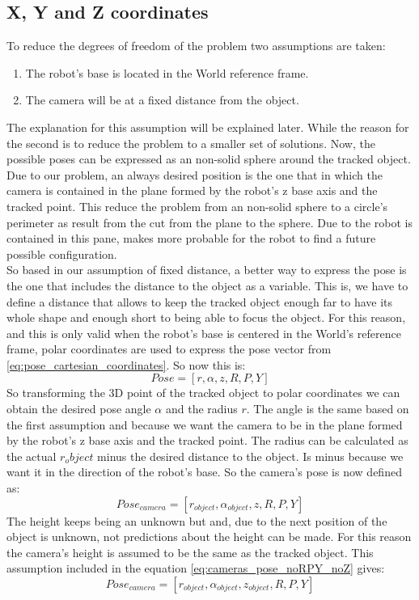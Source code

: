 \subsection{X, Y and Z coordinates} %
\label{sub:x_y_and_z_coordinates}
To reduce the degrees of freedom of the problem two assumptions are taken:
\begin{enumerate}
	\item The robot's base is located in the World reference frame.
	\item The camera will be at a fixed distance from the object.
\end{enumerate}
The explanation for this assumption will be explained later. While the reason for the second is to reduce the problem to a smaller set of solutions. Now, the possible poses can be expressed as an non-solid sphere around the tracked object.
Due to our problem, an always desired position is the one that in which the camera is contained in the plane formed by the robot's z base axis and the tracked point. This reduce the problem from an non-solid sphere to a circle's perimeter as result from the cut from the plane to the sphere.
Due to the robot is contained in this pane, makes more probable for the robot to find a future possible configuration.\\

So based in our assumption of fixed distance, a better way to express the pose is the one that includes the distance to the object as a variable.  
This is, we have to define a distance that allows to keep the tracked object enough far to have its whole shape and enough short to being able to focus the object.
For this reason, and this is only valid when the robot's base is centered in the World's reference frame, polar coordinates are used to express the pose vector from \ref{eq:pose_cartesian_coordinates}. So now this is:
	\begin{equation}
	\label{eq:pose_polar_coorinates}
		Pose = [r,\alpha,z,R,P,Y]
	\end{equation}
So transforming the 3D point of the tracked object to polar coordinates we can obtain the desired pose angle $\alpha$ and the radius $r$. 
The angle is the same based on the first assumption and because we want the camera to be in the plane formed by the robot's z base axis and the tracked point. 
The radius can be calculated as the actual $r_object$ minus the desired distance to the object. Is minus because we want it in the direction of the robot's base. 
So the camera's pose is now defined as:
	\begin{equation}
	\label{eq:cameras_pose_noRPY_noZ}
		Pose_{camera} = [r_{object},\alpha_{object},z,R,P,Y]
	\end{equation}
The height keeps being an unknown but and, due to the next position of the object is unknown, not predictions about the height can be made. 
For this reason the camera's height is assumed to be the same as the tracked object. This assumption included in the equation \ref{eq:cameras_pose_noRPY_noZ} gives:
	\begin{equation}
		\label{eq:cameras_pose_noRPY}
		Pose_{camera} = [r_{object},\alpha_{object},z_{object},R,P,Y]
	\end{equation}
